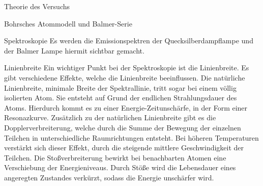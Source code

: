 \documentclass[pdftex, a4paper,11pt, twoside, ngerman]{report}
\begin{document}
\begin{chapter}{Theorie des Versuchs}
\begin{section}{Bohrsches Atommodell und Balmer-Serie}
\begin{subsection}{Spektroskopie}
        Es werden die Emissionspektren der Quecksilberdampflampe und der Balmer Lampe hiermit sichtbar gemacht.
      
      \end{subsection}
      
      
      
      \begin{subsection}{Linienbreite}
        \label{chp:TheorieBohrBalmerSerieLinienbreite}
        Ein wichtiger Punkt bei der Spektroskopie ist die Linienbreite. Es gibt verschiedene Effekte, welche die Linienbreite beeinflussen. Die natürliche Linienbreite, minimale Breite der Spektrallinie, tritt sogar bei einem völlig isolierten Atom. Sie entsteht auf Grund der endlichen Strahlungsdauer des Atoms. Hierdurch kommt es zu einer Energie-Zeitunschärfe, in der Form einer Resonazkurve. Zusätzlich zu der natürlichen Linienbreite gibt es die Dopplerverbreiterung, welche durch die Summe  der Bewegung der einzelnen Teilchen in unterschiedliche Raumrichtungen entsteht. Bei höheren Temperaturen verstärkt sich dieser Effekt, durch die steigende mittlere Geschwindigkeit der Teilchen. Die Stoßverbreiterung bewirkt bei benachbarten Atomen eine Verschiebung der Energieniveaus. Durch Stöße wird die Lebensdauer eines angeregten Zustandes verkürzt, sodass die Energie unschärfer wird.
        
        
      \end{subsection}
      
    \end{section}

  \end{chapter}
          
          
          
\end{document}
